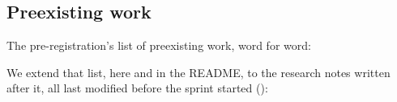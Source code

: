\subsection{Preexisting work}\label{app:preexisting}
The pre-registration's list of preexisting work, word for word:

We extend that list, here and in the README, to the research notes written after it, all last modified before the sprint started (\wtthDesignTZero):
\begin{center}\footnotesize

\end{center}

